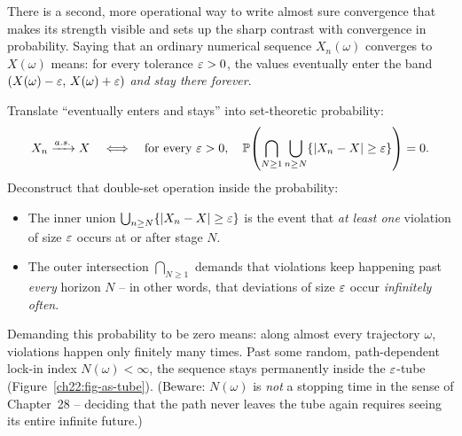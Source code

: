 There is a second, more operational way to write almost sure convergence that makes
its strength visible and sets up the sharp contrast with convergence in probability.
Saying that an ordinary numerical sequence $X_n(\omega)$ converges to $X(\omega)$ means:
for every tolerance $\varepsilon>0$, the values eventually enter the band
$(X(\omega)-\varepsilon,\, X(\omega)+\varepsilon)$ \emph{and stay there forever}.

Translate ``eventually enters and stays'' into set-theoretic probability:
\[
  X_n \xrightarrow{a.s.} X
  \quad\Longleftrightarrow\quad
  \text{for every } \varepsilon>0,\quad
  \operatorname{\mathbb{P}}\!\left(\bigcap_{N\ge1}\bigcup_{n\ge N} \{\lvert X_n - X\rvert \ge \varepsilon\}\right) = 0.
\]
Deconstruct that double-set operation inside the probability:
\begin{itemize}
  \item The inner union $\bigcup_{n\ge N} \{\lvert X_n - X\rvert \ge \varepsilon\}$ is the event
        that \emph{at least one} violation of size $\varepsilon$ occurs at or after stage $N$.
  \item The outer intersection $\bigcap_{N\ge1}$ demands that violations keep happening
        past \emph{every} horizon $N$ -- in other words, that deviations of size $\varepsilon$
        occur \emph{infinitely often}.
\end{itemize}

Demanding this probability to be zero means: along almost every trajectory $\omega$,
violations happen only finitely many times. Past some random, path-dependent lock-in
index $N(\omega) < \infty$, the sequence stays permanently inside the $\varepsilon$-tube
(Figure~\ref{ch22:fig-as-tube}). (Beware: $N(\omega)$ is \emph{not} a stopping time in the
sense of Chapter~28 -- deciding that the path never leaves the tube again requires seeing
its entire infinite future.)

